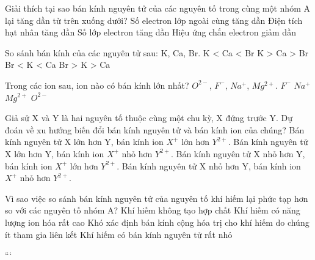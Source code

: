 \begin{ex}
    Giải thích tại sao bán kính nguyên tử của các nguyên tố trong cùng một nhóm A lại tăng dần từ trên xuống dưới?
    \choice
    {Số electron lớp ngoài cùng tăng dần}
    {Điện tích hạt nhân tăng dần}
    {\True Số lớp electron tăng dần}
    {Hiệu ứng chắn electron giảm dần}
\end{ex}

\begin{ex}
    So sánh bán kính của các nguyên tử sau:  K, Ca, Br. 
    \choice
    {K < Ca < Br}
    {\True K > Ca > Br}
    {Br < K < Ca}
    {Br > K > Ca}
\end{ex}

\begin{ex}
    Trong các ion sau, ion nào có bán kính lớn nhất? $O^{2-}$, $F^-$, $Na^+$, $Mg^{2+}$.
    \choice
    {$F^-$}
    {$Na^+$}
    {$Mg^{2+}$}
    {\True $O^{2-}$}
\end{ex}

\begin{ex}
    Giả sử X và Y là hai nguyên tố thuộc cùng một chu kỳ, X đứng trước Y. Dự đoán về xu hướng biến đổi bán kính nguyên tử và bán kính ion của chúng?
    \choice
    {Bán kính nguyên tử X lớn hơn Y, bán kính ion $X^+$ lớn hơn $Y^{2+}$.}
    {\True Bán kính nguyên tử X lớn hơn Y, bán kính ion $X^+$ nhỏ hơn $Y^{2+}$.}
    {Bán kính nguyên tử X nhỏ hơn Y, bán kính ion $X^+$ lớn hơn $Y^{2+}$.}
    {Bán kính nguyên tử X nhỏ hơn Y, bán kính ion $X^+$ nhỏ hơn $Y^{2+}$.}
\end{ex}

\begin{ex}
    Vì sao việc so sánh bán kính nguyên tử của nguyên tố khí hiếm lại phức tạp hơn so với các nguyên tố nhóm A?
    \choice
    {Khí hiếm không tạo hợp chất}
    {Khí hiếm có năng lượng ion hóa rất cao}
    {\True Khó xác định bán kính cộng hóa trị cho khí hiếm do chúng ít tham gia liên kết}
    {Khí hiếm có bán kính nguyên tử rất nhỏ}
\end{ex}
``` 
